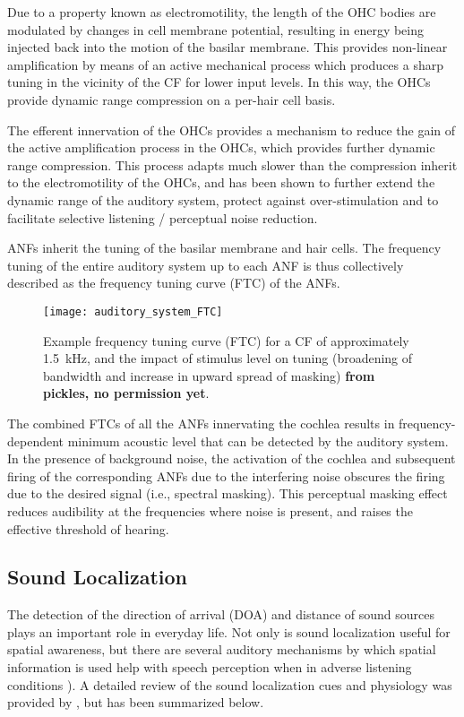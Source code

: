 Due to a property known as electromotility, the length of the OHC bodies are modulated by changes in cell membrane potential, resulting in energy being injected back into the motion of the basilar membrane. This provides non-linear amplification by means of an active mechanical process which produces a sharp tuning in the vicinity of the CF for lower input levels. In this way, the OHCs provide dynamic range compression on a per-hair cell basis.

The efferent innervation of the OHCs provides a mechanism to reduce the gain of the active amplification process in the OHCs, which provides further dynamic range compression. This process adapts much slower than the compression inherit to the electromotility of the OHCs, and has been shown to further extend the dynamic range of the auditory system, protect against over-stimulation and to facilitate selective listening / perceptual noise reduction.

ANFs inherit the tuning of the basilar membrane and hair cells. The frequency tuning of the entire auditory system up to each ANF is thus collectively described as the frequency tuning curve (FTC) of the ANFs.

\begin{figure}[H]
	\centering
	\texttt{[image: auditory\_system\_FTC]}
	\caption[Example of frequency tuning curve (FTC)]{Example frequency tuning curve (FTC) for a CF of approximately \qty{1.5}{\kilo\hertz}, and the impact of stimulus level on tuning (broadening of bandwidth and increase in upward spread of masking) \textbf{from pickles, no permission yet}.}
	\label{fig:auditory_system_FTC}
\end{figure}

The combined FTCs of all the ANFs innervating the cochlea results in frequency-dependent minimum acoustic level that can be detected by the auditory system. In the presence of background noise, the activation of the cochlea and subsequent firing of the corresponding ANFs due to the interfering noise obscures the firing due to the desired signal (i.e., spectral masking). This perceptual masking effect reduces audibility at the frequencies where noise is present, and raises the effective threshold of hearing. 


\subsection{Sound Localization}

The detection of the direction of arrival (DOA) and distance of sound sources plays an important role in everyday life. Not only is sound localization useful for spatial awareness, but there are several auditory mechanisms by which spatial information is used help with speech perception when in adverse listening conditions \citep[e.g., the cocktail party effect, reviewed by][]{bronkhorst2000cocktail}). A detailed review of the sound localization cues and physiology was provided by  \cite{risoud2018localization}, but has been summarized below.

